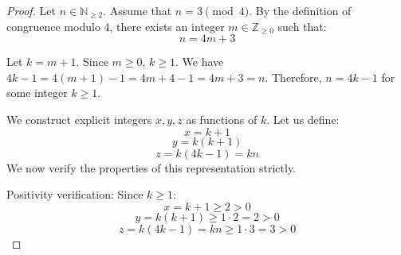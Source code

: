 \documentclass[12pt,a4paper]{article}
\begin{document}
\begin{proof}
Let $n \in \mathbb{N}_{\geq 2}$. Assume that $n = 3 \pmod 4$.
By the definition of congruence modulo 4, there exists an integer $m \in \mathbb{Z}_{\geq 0}$ such that:
\begin{equation}
n = 4m + 3
\end{equation}

Let $k = m + 1$. Since $m \geq 0$, $k \geq 1$.
We have $4k - 1 = 4(m + 1) - 1 = 4m + 4 - 1 = 4m + 3 = n$.
Therefore, $n = 4k - 1$ for some integer $k \geq 1$.

We construct explicit integers $x, y, z$ as functions of $k$. Let us define:
\begin{equation}
x = k+1
\end{equation}
\begin{equation}
y = k(k+1)
\end{equation}
\begin{equation}
z = k(4k-1) = kn
\end{equation}
We now verify the properties of this representation strictly.

Positivity verification:
Since $k \geq 1$:
\begin{equation}
x = k + 1 \geq 2 > 0
\end{equation}
\begin{equation}
y = k(k + 1) \geq 1 \cdot 2 = 2 > 0
\end{equation}
\begin{equation}
z = k(4k - 1) = kn \geq 1 \cdot 3 = 3 > 0
\end{equation}


\end{proof}
\end{document}
